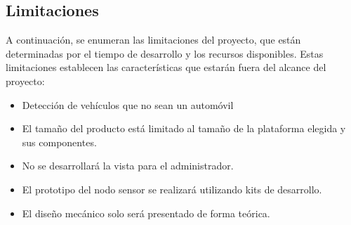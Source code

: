 \subsection{Limitaciones}
A continuación, se enumeran las limitaciones del proyecto, que están determinadas por el tiempo de desarrollo y los recursos disponibles. Estas limitaciones establecen las características que estarán fuera del alcance del proyecto:
\begin{itemize}
    \item Detección de vehículos que no sean un automóvil
    \item El tamaño del producto está limitado al tamaño de la plataforma elegida y sus componentes.
    \item No se desarrollará la vista para el administrador.
    \item El prototipo del nodo sensor se realizará utilizando kits de desarrollo.
    \item El diseño mecánico solo será presentado de forma teórica.
\end{itemize}
